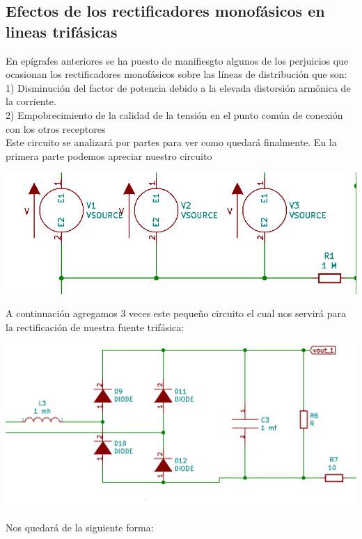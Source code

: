 \documentclass[12pt,a4paper]{article}
\begin{document}
\subsection{Efectos de los rectificadores monofásicos en lineas trifásicas}
\begin{flushleft}
En epígrafes anteriores se ha puesto de manifiesgto algunos de los perjuicios que ocasionan los rectificadores monofásicos sobre las líneas de distribución que son:\\
1) Disminución del factor de potencia debido a la elevada distorsión armónica de la corriente.\\
2) Empobrecimiento de la calidad de la tensión en el punto común de conexión con los otros receptores
\\Este circuito se analizará por partes para ver como quedará finalmente.
En la primera parte podemos apreciar nuestro circuito
\begin{center}
\includegraphics[scale=0.8]{imagenes/p5/Circuito4tri.png} \\
\end{center}
A continuación agregamos 3 veces este pequeño circuito el cual nos servirá para la rectificación de nuestra fuente trifásica:\\
\begin{center}
\includegraphics[scale=0.6]{imagenes/p5/Circuito4mono.png} \\
\end{center} 
\newpage
Nos quedará de la siguiente forma:\\

\end{flushleft}
\end{document}
